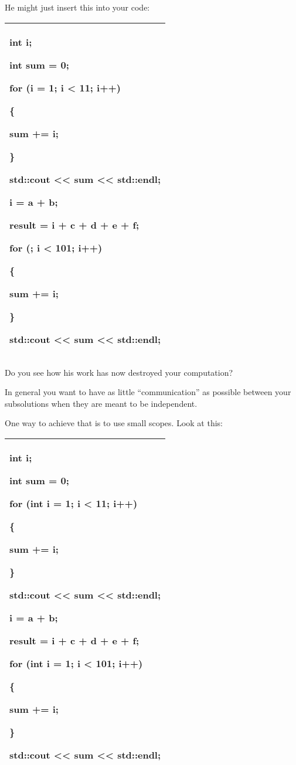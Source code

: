 \documentclass[
]{article}
\begin{document}
He might just insert this into your code:

\begin{longtable}[]{@{}l@{}}
\toprule
\endhead
\begin{minipage}[t]{0.97\columnwidth}\raggedright
int i;

int sum = 0;

for (i = 1; i \textless{} 11; i++)

\{

sum += i;

\}

std::cout \textless\textless{} sum \textless\textless{} std::endl;

i = a + b;

result = i + c + d + e + f;

for (; i \textless{} 101; i++)

\{

sum += i;

\}

std::cout \textless\textless{} sum \textless\textless{} std::endl;\strut
\end{minipage}\tabularnewline
\bottomrule
\end{longtable}

Do you see how his work has now destroyed your computation?

In general you want to have as little ``communication'' as possible
between your subsolutions when they are meant to be independent.

One way to achieve that is to use small scopes. Look at this:

\begin{longtable}[]{@{}l@{}}
\toprule
\endhead
\begin{minipage}[t]{0.97\columnwidth}\raggedright
\textbf{int i};

int sum = 0;

for (\textbf{int i = 1}; i \textless{} 11; i++)

\{

sum += i;

\}

std::cout \textless\textless{} sum \textless\textless{} std::endl;

i = a + b;

result = i + c + d + e + f;

for (\textbf{int i = 1}; i \textless{} 101; i++)

\{

sum += i;

\}

std::cout \textless\textless{} sum \textless\textless{} std::endl;\strut
\end{minipage}\tabularnewline
\bottomrule
\end{longtable}
\end{document}
